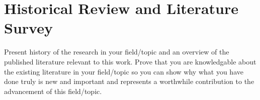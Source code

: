 \chapter{Historical Review and Literature Survey}\label{chap:history}

Present history of the research in your field/topic and an overview of the published literature relevant to this work. Prove that you are knowledgable about the existing literature in your field/topic so you can show why what you have done truly is new and important and represents a worthwhile contribution to the advancement of this field/topic.

